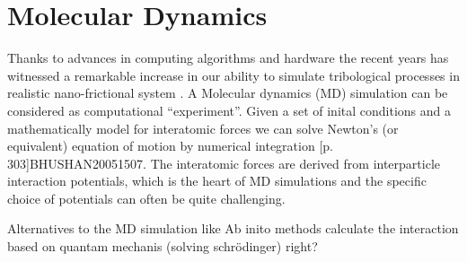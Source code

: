 \section{Molecular Dynamics}

Thanks to advances in computing algorithms and hardware the recent years has witnessed a remarkable increase in our ability to simulate tribological processes in realistic nano-frictional system \cite{Manini_2016}. A Molecular dynamics (MD) simulation can be considered as computational ``experiment''. Given a set of inital conditions and a mathematically model for interatomic forces we can solve Newton's (or equivalent) equation of motion by numerical integration [p. 303]{BHUSHAN20051507}. The interatomic forces are derived from interparticle interaction potentials, which is the heart of MD simulations and the specific choice of potentials can often be quite challenging.


Alternatives to the MD simulation like Ab inito methods calculate the interaction based on quantam mechanis (solving schrödinger) right?


















